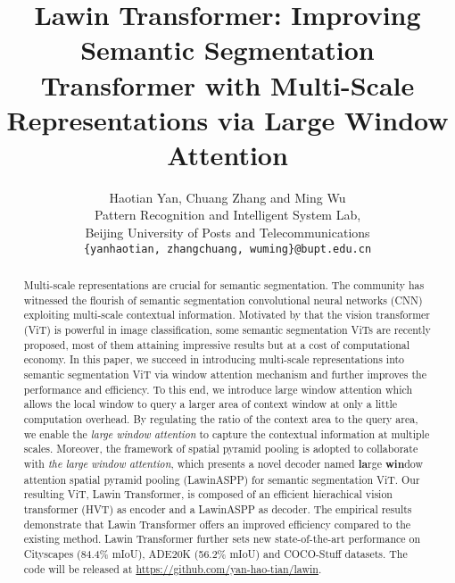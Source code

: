 \documentclass[10pt,twocolumn,letterpaper]{article}
\begin{document}
\title{Lawin Transformer: Improving Semantic Segmentation Transformer with Multi-Scale Representations via Large Window Attention}

\author{Haotian Yan, Chuang Zhang and Ming Wu \\
Pattern Recognition and Intelligent System Lab, \\ Beijing University of Posts and Telecommunications\\
{\tt\small \{yanhaotian, zhangchuang, wuming\}@bupt.edu.cn}
}
\maketitle

\begin{abstract}
Multi-scale representations are crucial for semantic segmentation. The community has witnessed the flourish of semantic segmentation convolutional neural networks (CNN) exploiting multi-scale contextual information. Motivated by that the vision transformer (ViT) is powerful in image classification, some semantic segmentation ViTs are recently proposed, most of them attaining impressive results but at a cost of computational economy. In this paper, we succeed in introducing multi-scale representations into semantic segmentation ViT via window attention mechanism and further improves the performance and efficiency. To this end, we introduce large window attention which allows the local window to query a larger area of context window at only a little computation overhead. By regulating the ratio of the context area to the query area, we enable the \textit{large window attention} to capture the contextual information at multiple scales. Moreover, the framework of spatial pyramid pooling is adopted to collaborate with \textit{the large window attention}, which presents a novel decoder named \textbf{la}rge \textbf{win}dow attention spatial pyramid pooling (LawinASPP) for semantic segmentation ViT. Our resulting ViT, Lawin Transformer, is composed of an efficient hierachical vision transformer (HVT) as encoder and a LawinASPP as decoder. The empirical results demonstrate that Lawin Transformer offers an improved efficiency compared to the existing method. Lawin Transformer further sets new state-of-the-art performance on Cityscapes (84.4\% mIoU), ADE20K (56.2\% mIoU) and COCO-Stuff datasets. The code will be released at \href{https://github.com/yan-hao-tian/lawin}{https://github.com/yan-hao-tian/lawin}.

\end{abstract}
\end{document}
